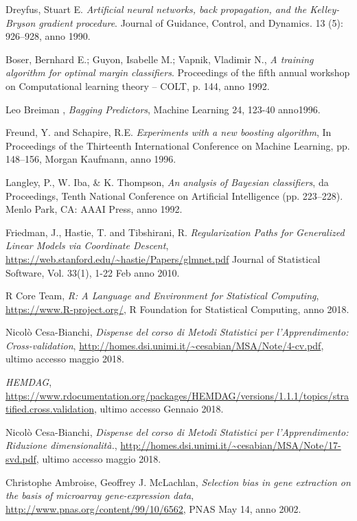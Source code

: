 \documentclass[12pt]{report}
\begin{document}
\begin{thebibliography}{00}
 Dreyfus, Stuart E. \emph{Artificial neural networks, back propagation, and the Kelley-Bryson gradient procedure}. Journal of Guidance, Control, and Dynamics. 13 (5): 926–928, anno 1990.

 Boser, Bernhard E.; Guyon, Isabelle M.; Vapnik, Vladimir N., \emph{A training algorithm for optimal margin classifiers}. Proceedings of the fifth annual workshop on Computational learning theory – COLT, p. 144,  anno 1992. 

 Leo Breiman , \emph{Bagging Predictors},
Machine Learning 24, 123-40  anno1996.

 Freund, Y. and Schapire, R.E. \emph{Experiments with a new boosting algorithm},
In Proceedings of the Thirteenth International Conference on Machine Learning, pp. 148–156, Morgan Kaufmann, anno 1996.

 Langley, P., W. Iba, \& K. Thompson, \emph{An analysis of Bayesian classifiers}, da Proceedings, Tenth National Conference on Artificial Intelligence (pp. 223–228). Menlo Park, CA: AAAI Press, anno 1992.

 Friedman, J., Hastie, T. and Tibshirani, R. 
\emph{Regularization Paths for Generalized Linear Models via Coordinate Descent}, \url{https://web.stanford.edu/~hastie/Papers/glmnet.pdf}
Journal of Statistical Software, Vol. 33(1), 1-22 Feb anno 2010.

R Core Team, 
\emph{R: A Language and Environment for Statistical Computing}, \url{https://www.R-project.org/}, R Foundation for Statistical Computing, anno 2018.


Nicolò Cesa-Bianchi, \emph{Dispense del corso di Metodi Statistici per l'Apprendimento: Cross-validation},  \url{http://homes.dsi.unimi.it/~cesabian/MSA/Note/4-cv.pdf}, ultimo accesso maggio 2018.

\emph{HEMDAG}, \url{https://www.rdocumentation.org/packages/HEMDAG/versions/1.1.1/topics/stratified.cross.validation}, ultimo accesso Gennaio 2018.

Nicolò Cesa-Bianchi, \emph{Dispense del corso di Metodi Statistici per l'Apprendimento: Riduzione dimensionalità.},  \url{http://homes.dsi.unimi.it/~cesabian/MSA/Note/17-svd.pdf}, ultimo accesso maggio 2018.

 Christophe Ambroise, Geoffrey J. McLachlan, \emph{Selection bias in gene extraction on the basis of microarray gene-expression data}, \url{http://www.pnas.org/content/99/10/6562}, PNAS May 14, anno 2002.


\end{thebibliography}
\end{document}
